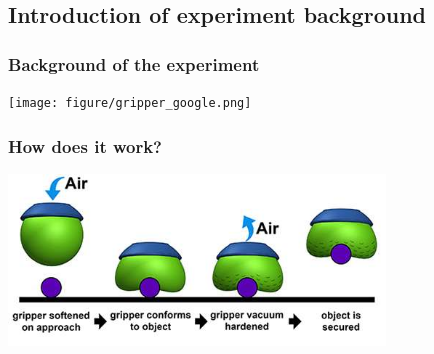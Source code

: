 \documentclass[xcolor=dvipsnames]{beamer}%
\begin{document}
\begin{frame}
\end{frame}


\subsection{Introduction of experiment background} %


\begin{frame}
\frametitle{Background of the experiment}
  \centering
  \texttt{[image: figure/gripper\_google.png]}	
  
\end{frame}


\begin{frame}
\frametitle{How does it work?}
  \centering
  \includegraphics[width=0.75\textwidth]{figure/how_gripper_works.jpg}		
\end{frame}



\end{document}
